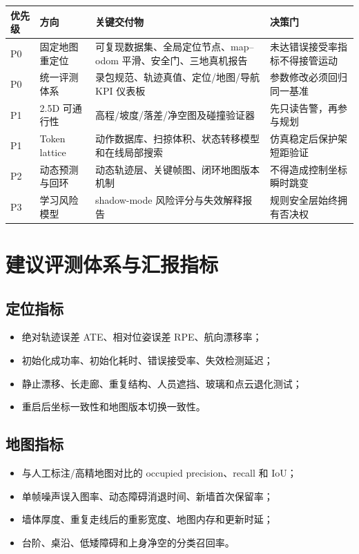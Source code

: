 \documentclass[11pt,a4paper,fontset=none]{ctexart}
\begin{document}
\begin{tabularx}{\textwidth}{p{1.2cm} p{3.0cm} X p{3.0cm}}
\toprule
优先级 & 方向 & 关键交付物 & 决策门 \\
\midrule
P0 & 固定地图重定位 & 可复现数据集、全局定位节点、map--odom 平滑、安全门、三地真机报告 & 未达错误接受率指标不得接管运动 \\
P0 & 统一评测体系 & 录包规范、轨迹真值、定位/地图/导航 KPI 仪表板 & 参数修改必须回归同一基准 \\
P1 & 2.5D 可通行性 & 高程/坡度/落差/净空图及碰撞验证器 & 先只读告警，再参与规划 \\
P1 & Token lattice & 动作数据库、扫掠体积、状态转移模型和在线局部搜索 & 仿真稳定后保护架短距验证 \\
P2 & 动态预测与回环 & 动态轨迹层、关键帧图、闭环地图版本机制 & 不得造成控制坐标瞬时跳变 \\
P3 & 学习风险模型 & shadow-mode 风险评分与失效解释报告 & 规则安全层始终拥有否决权 \\
\bottomrule
\end{tabularx}

\section{建议评测体系与汇报指标}

\subsection{定位指标}

\begin{itemize}
  \item 绝对轨迹误差 ATE、相对位姿误差 RPE、航向漂移率；
  \item 初始化成功率、初始化耗时、错误接受率、失效检测延迟；
  \item 静止漂移、长走廊、重复结构、人员遮挡、玻璃和点云退化测试；
  \item 重启后坐标一致性和地图版本切换一致性。
\end{itemize}

\subsection{地图指标}

\begin{itemize}
  \item 与人工标注/高精地图对比的 occupied precision、recall 和 IoU；
  \item 单帧噪声误入图率、动态障碍消退时间、新墙首次保留率；
  \item 墙体厚度、重复走线后的重影宽度、地图内存和更新时延；
  \item 台阶、桌沿、低矮障碍和上身净空的分类召回率。
\end{itemize}
\end{document}
